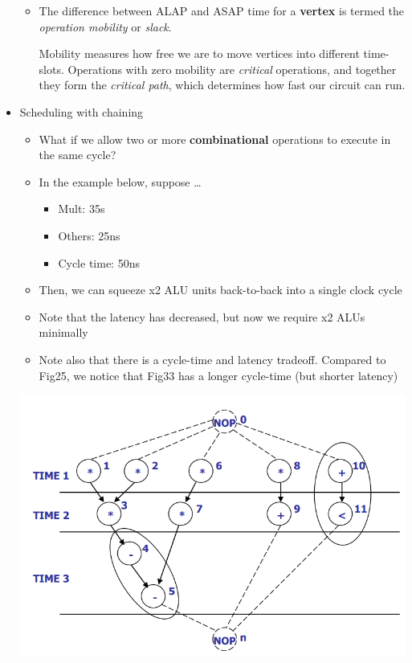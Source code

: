 \documentclass{article}
\begin{document}
\begin{itemize}
\begin{itemize}
            \item The difference between ALAP and ASAP time for a \textbf{vertex} is termed the \textit{operation mobility} or \textit{slack}.
            
                    Mobility measures how free we are to move vertices into different time-slots. Operations with zero mobility are \textit{critical} operations,
                    and together they form the \textit{critical path}, which determines how fast our circuit can run.
            \end{itemize}

    \item Scheduling with chaining
            \begin{itemize}
                \item What if we allow two or more \textbf{combinational} operations to execute in the same cycle?
                \item In the example below, suppose \dots
                    \begin{itemize}
                        \item Mult: 35s
                        \item Others: 25ns
                        \item Cycle time: 50ns
                    \end{itemize}
                \item Then, we can squeeze x2 ALU units back-to-back into a single clock cycle
                \item Note that the latency has decreased, but now we require x2 ALUs minimally
                \item Note also that there is a cycle-time and latency tradeoff. Compared to Fig25, we notice that Fig33 has a longer cycle-time (but shorter latency)
            \end{itemize}
    
            \begin{minipage}{\linewidth}
                \centering
                \includegraphics[width=14cm, scale=1]{S2/chaining.PNG}
            \end{minipage}

\end{itemize}
\end{document}
